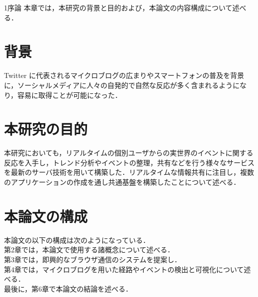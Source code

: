 \chapterhead
{1}{序論}
{本章では，本研究の背景と目的および，本論文の内容構成について述べる．}

\section{背景}
Twitter に代表されるマイクロブログの広まりやスマートフォンの普及を背景に，ソーシャルメディアに人々の自発的で自然な反応が多く含まれるようになり，容易に取得ことが可能になった．


\section{本研究の目的}
本研究においても，リアルタイムの個別ユーザからの実世界のイベントに関する反応を入手し，トレンド分析やイベントの整理，共有などを行う様々なサービスを最新のサーバ技術を用いて構築した．リアルタイムな情報共有に注目し，複数のアプリケーションの作成を通し共通基盤を構築したことについて述べる．


\section{本論文の構成}
本論文の以下の構成は次のようになっている．\\
第2章では，本論文で使用する諸概念について述べる．\\
第3章では，即興的なブラウザ通信のシステムを提案し．\\
第4章では，マイクロブログを用いた経路やイベントの検出と可視化について述べる．\\
最後に，第6章で本論文の結論を述べる．\\
